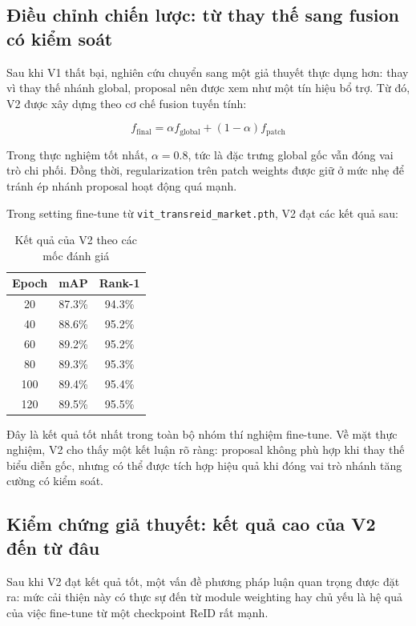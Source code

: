 \subsection{Điều chỉnh chiến lược: từ thay thế sang fusion có kiểm soát}

Sau khi V1 thất bại, nghiên cứu chuyển sang một giả thuyết thực dụng hơn: thay vì thay thế nhánh global, proposal nên được xem như một tín hiệu bổ trợ. Từ đó, V2 được xây dựng theo cơ chế fusion tuyến tính:

\[
f_{\text{final}} = \alpha f_{\text{global}} + (1 - \alpha) f_{\text{patch}}
\]

Trong thực nghiệm tốt nhất, \(\alpha = 0.8\), tức là đặc trưng global gốc vẫn đóng vai trò chi phối. Đồng thời, regularization trên patch weights được giữ ở mức nhẹ để tránh ép nhánh proposal hoạt động quá mạnh.

Trong setting fine-tune từ \texttt{vit\_transreid\_market.pth}, V2 đạt các kết quả sau:

\begin{table}[!h]
    \centering
    \begin{tabular}{c c c}
        \hline
        Epoch & mAP & Rank-1 \\
        \hline
        20 & 87.3\% & 94.3\% \\
        40 & 88.6\% & 95.2\% \\
        60 & 89.2\% & 95.2\% \\
        80 & 89.3\% & 95.3\% \\
        100 & 89.4\% & 95.4\% \\
        120 & 89.5\% & 95.5\% \\
        \hline
    \end{tabular}
    \caption{Kết quả của V2 theo các mốc đánh giá}
    \label{tab:v2_results}
\end{table}

Đây là kết quả tốt nhất trong toàn bộ nhóm thí nghiệm fine-tune. Về mặt thực nghiệm, V2 cho thấy một kết luận rõ ràng: proposal không phù hợp khi thay thế biểu diễn gốc, nhưng có thể được tích hợp hiệu quả khi đóng vai trò nhánh tăng cường có kiểm soát.

\subsection{Kiểm chứng giả thuyết: kết quả cao của V2 đến từ đâu}

Sau khi V2 đạt kết quả tốt, một vấn đề phương pháp luận quan trọng được đặt ra: mức cải thiện này có thực sự đến từ module weighting hay chủ yếu là hệ quả của việc fine-tune từ một checkpoint ReID rất mạnh.

